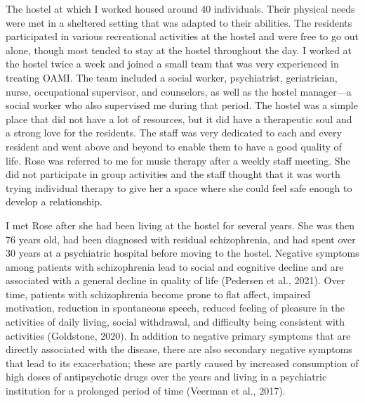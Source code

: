 \documentclass[authordate, empirical, issue]{jote-new-article}
\begin{document}
The hostel at which I worked housed around 40 individuals. Their physical needs were met in a sheltered setting that was adapted to their abilities. The residents participated in various recreational activities at the hostel and were free to go out alone, though most tended to stay at the hostel throughout the day. I worked at the hostel twice a week and joined a small team that was very experienced in treating OAMI. The team included a social worker, psychiatrist, geriatrician, nurse, occupational supervisor, and counselors, as well as the hostel manager—a social worker who also supervised me during that period. The hostel was a simple place that did not have a lot of resources, but it did have a therapeutic soul and a strong love for the residents. The staff was very dedicated to each and every resident and went above and beyond to enable them to have a good quality of life. Rose was referred to me for music therapy after a weekly staff meeting. She did not participate in group activities and the staff thought that it was worth trying individual therapy to give her a space where she could feel safe enough to develop a relationship.



I met Rose after she had been living at the hostel for several years. She was then 76 years old, had been diagnosed with residual schizophrenia, and had spent over 30 years at a psychiatric hospital before moving to the hostel. Negative symptoms among patients with schizophrenia lead to social and cognitive decline and are associated with a general decline in quality of life (Pedersen et al., 2021). Over time, patients with schizophrenia become prone to flat affect, impaired motivation, reduction in spontaneous speech, reduced feeling of pleasure in the activities of daily living, social withdrawal, and difficulty being consistent with activities (Goldstone, 2020). In addition to negative primary symptoms that are directly associated with the disease, there are also secondary negative symptoms that lead to its exacerbation; these are partly caused by increased consumption of high doses of antipsychotic drugs over the years and living in a psychiatric institution for a prolonged period of time (Veerman et al., 2017).
\end{document}
